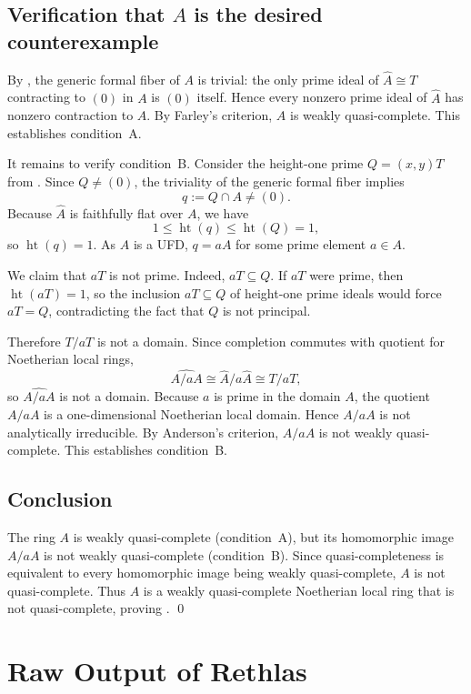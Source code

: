 \documentclass[]{pkuai4m}
\theoremstyle{plain}
\theoremstyle{definition}
\begin{document}
\subsection*{Verification that $A$ is the desired counterexample}

By , the generic formal fiber of $A$ is trivial: the only prime ideal of $\widehat A\cong T$ contracting to $(0)$ in $A$ is $(0)$ itself. Hence every nonzero prime ideal of $\widehat A$ has nonzero contraction to $A$. By Farley’s criterion, $A$ is weakly quasi-complete. This establishes condition~A.

It remains to verify condition~B. Consider the height-one prime $Q=(x,y)T$ from . Since $Q\neq (0)$, the triviality of the generic formal fiber implies
\[
q:=Q\cap A \neq (0).
\]
Because $\widehat A$ is faithfully flat over $A$, we have
\[
1 \le \operatorname{ht}(q)\le \operatorname{ht}(Q)=1,
\]
so $\operatorname{ht}(q)=1$. As $A$ is a UFD, $q=aA$ for some prime element $a\in A$.

We claim that $aT$ is not prime. Indeed, $aT\subseteq Q$. If $aT$ were prime, then $\operatorname{ht}(aT)=1$, so the inclusion $aT\subseteq Q$ of height-one prime ideals would force $aT=Q$, contradicting the fact that $Q$ is not principal.

Therefore $T/aT$ is not a domain. Since completion commutes with quotient for Noetherian local rings,
\[
\widehat{A/aA}\cong \widehat A/a\widehat A \cong T/aT,
\]
so $\widehat{A/aA}$ is not a domain. Because $a$ is prime in the domain $A$, the quotient $A/aA$ is a one-dimensional Noetherian local domain. Hence $A/aA$ is not analytically irreducible. By Anderson’s criterion, $A/aA$ is not weakly quasi-complete. This establishes condition~B.

\subsection*{Conclusion}

The ring $A$ is weakly quasi-complete (condition~A), but its homomorphic image $A/aA$ is not weakly quasi-complete (condition~B). Since quasi-completeness is equivalent to every homomorphic image being weakly quasi-complete, $A$ is not quasi-complete. Thus $A$ is a weakly quasi-complete Noetherian local ring that is not quasi-complete, proving . \qed




\section{Raw Output of Rethlas}
\end{document}
